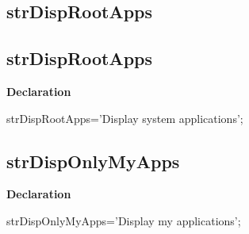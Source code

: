 \documentclass{report}
\newif\ifpdf
\begin{document}
\subsection*{\large{\textbf{strDispRootApps}}\normalsize\hspace{1ex}\hrulefill}
\else
\subsection*{strDispRootApps}
\fi
\label{trstrings-strDispRootApps}
\begin{list}{}{
\setlength{\itemindent}{0cm}
\setlength{\listparindent}{0cm}
\setlength{\leftmargin}{\evensidemargin}
\addtolength{\leftmargin}{\tmplength}
\settowidth{\labelsep}{X}
\addtolength{\leftmargin}{\labelsep}
\setlength{\labelwidth}{\tmplength}
}
\item[\textbf{Declaration}\hfill]
\ifpdf
\begin{flushleft}
\fi
\begin{ttfamily}
strDispRootApps='Display system applications';\end{ttfamily}

\ifpdf
\end{flushleft}
\fi

\end{list}
\ifpdf
\subsection*{\large{\textbf{strDispOnlyMyApps}}\normalsize\hspace{1ex}\hrulefill}
\else
\subsection*{strDispOnlyMyApps}
\fi
\label{trstrings-strDispOnlyMyApps}
\begin{list}{}{
\setlength{\itemindent}{0cm}
\setlength{\listparindent}{0cm}
\setlength{\leftmargin}{\evensidemargin}
\addtolength{\leftmargin}{\tmplength}
\settowidth{\labelsep}{X}
\addtolength{\leftmargin}{\labelsep}
\setlength{\labelwidth}{\tmplength}
}
\item[\textbf{Declaration}\hfill]
\ifpdf
\begin{flushleft}
\fi
\begin{ttfamily}
strDispOnlyMyApps='Display my applications';\end{ttfamily}

\ifpdf
\end{flushleft}
\fi

\end{list}
\ifpdf
\end{document}

